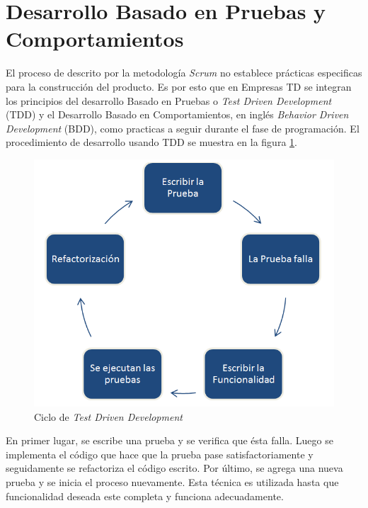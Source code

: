 \section{Desarrollo Basado en Pruebas y Comportamientos} \label{sect:TDD_BDD}

El proceso de descrito por la metodología \textit{Scrum} no establece prácticas especificas para la construcción del producto. Es por esto que en Empresas TD se integran los principios del desarrollo Basado en Pruebas o \textit{Test Driven Development} (TDD)  y el Desarrollo Basado en Comportamientos, en inglés \textit{Behavior Driven Development} (BDD), como practicas a seguir durante el fase de programación. El procedimiento de desarrollo usando TDD se muestra en la figura \ref{img:tdd}.

\begin{figure}[h]
	\begin{center}
		\includegraphics[scale=0.7]{imagenes/tdd.png}
	\end{center}
	\caption{
		\label{img:tdd}
		Ciclo de \textit{Test Driven Development}
	}
\end{figure}

En primer lugar, se escribe una prueba y se verifica que ésta falla. Luego se implementa el código que hace que la prueba pase satisfactoriamente y seguidamente se refactoriza el código escrito. Por último, se agrega una nueva prueba y se inicia el proceso nuevamente. Esta técnica es utilizada hasta que funcionalidad deseada este completa y funciona adecuadamente. 

